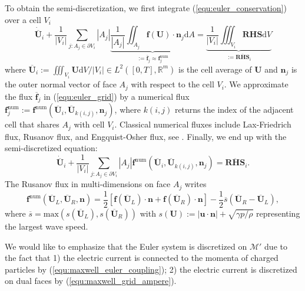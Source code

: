 \documentclass{article}
\begin{document}
To obtain the semi-discretization, we first integrate (\ref{equ:euler_conservation}) over a cell $V_i$ 
\begin{equation} \label{equ:euler_grid} 
    \dot{\overline{\mathbf{U}}}_i + \frac{1}{|V_i|}\sum_{j:A_j\in\partial V_i} |A_j|\underbrace{\frac{1}{|A_j|}\iint_{A_j}\mathbf{f}(\mathbf{U})\cdot \mathbf{n}_j \text{d}A}_{:= \overline{\mathbf{f}}_j \approx \mathbf{f}^\text{num}_j} = \underbrace{\frac{1}{|V_i|}\iiint_{V_i} \mathbf{RHS} \text{d}V}_{:= \overline{\mathbf{RHS}}_i}
\end{equation}
where $\overline{\mathbf{U}}_i := \iiint_{V_i} \mathbf{U} \text{d}V / |V_i| \in L^2([0,T],\mathbb{R}^m)$ is the cell average of $\mathbf{U}$ and $\mathbf{n}_j$ is the outer normal vector of face $A_j$ with respect to the cell $V_i$. We approximate the flux $\overline{\mathbf{f}}_j$ in (\ref{equ:euler_grid}) by a numerical flux $\mathbf{f}^\text{num}_j := \mathbf{f}^\text{num}\left(\overline{\mathbf{U}}_i, \overline{\mathbf{U}}_{k(i,j)}, \mathbf{n}_j\right)$, where $k(i,j)$ returns the index of the adjacent cell that shares $A_j$ with cell $V_i$. Classical numerical fluxes include Lax-Friedrich flux, Rusanov flux, and Engquist-Osher flux, see \cite[][p. 44-46]{mishra_2019}. Finally, we end up with the semi-discretized equation:
\begin{equation}
    \dot{\overline{\mathbf{U}}}_i + \frac{1}{|V_i|}\sum_{j:A_j\in\partial V_i} |A_j| \mathbf{f}^\text{num}\left(\overline{\mathbf{U}}_i, \overline{\mathbf{U}}_{k(i,j)}, \mathbf{n}_j\right) = \overline{\mathbf{RHS}}_i.
    \label{equ:fvm}
\end{equation}
The Rusanov flux in multi-dimensions on face $A_j$ writes
\begin{equation} \label{equ:rusanov-flux-3d}
    \mathbf{f}^\text{num}\left(\overline{\mathbf{U}}_L, \overline{\mathbf{U}}_R, \mathbf{n}\right) = \frac{1}{2}\left[\mathbf{f}(\overline{\mathbf{U}}_L)\cdot\mathbf{n} + \mathbf{f}(\overline{\mathbf{U}}_R)\cdot\mathbf{n}\right] - \frac{1}{2}\overline{s}\left(\overline{\mathbf{U}}_R - \overline{\mathbf{U}}_L\right),  
\end{equation}
where $\overline{s} = \text{max}(s(\overline{\mathbf{U}}_L), s(\overline{\mathbf{U}}_R))$ with $s(\mathbf{U}) := |\mathbf{u}\cdot\mathbf{n}| + \sqrt{\gamma p/\rho}$ representing the largest wave speed. 

We would like to emphasize that the Euler system is discretized on $\mathcal{M}'$ due to the fact that 1) the electric current is connected to the momenta of charged particles by (\ref{equ:maxwell_euler_coupling}); 2) the electric current is discretized on dual faces by (\ref{equ:maxwell_grid_ampere}).
\end{document}

